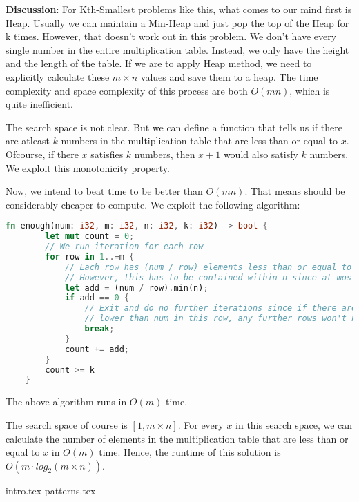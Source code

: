 \textbf{Discussion}: For Kth-Smallest problems like this, what comes to our mind first is Heap. Usually we can maintain a Min-Heap and just pop the top of the Heap for k times. However, that doesn't work out in this problem. We don't have every single number in the entire multiplication table. Instead, we only have the height and the length of the table. If we are to apply Heap method, we need to explicitly calculate these $m \times n$ values and save them to a heap. The time complexity and space complexity of this process are both $O(mn)$, which is quite inefficient.

The search space is not clear. But we can define a function  that tells us if there are atleast $k$ numbers in the multiplication table that are less than or equal to $x$. Ofcourse, if there $x$ satisfies $k$ numbers, then $x+1$ would also satisfy $k$ numbers. We exploit this monotonicity property.

Now, we intend to beat time to be better than $O(mn)$. That means  should be considerably cheaper to compute. We exploit the following algorithm:

\begin{lstlisting}[language=Rust, caption=Rust implementation of enough function]
    fn enough(num: i32, m: i32, n: i32, k: i32) -> bool {
        let mut count = 0;
        // We run iteration for each row
        for row in 1..=m {
            // Each row has (num / row) elements less than or equal to num. 
            // However, this has to be contained within n since at most there are n columns.
            let add = (num / row).min(n);
            if add == 0 {
                // Exit and do no further iterations since if there are no numbers 
                // lower than num in this row, any further rows won't have any as well.
                break;
            }
            count += add;
        }
        count >= k
    }
\end{lstlisting}

The above algorithm runs in $O(m)$ time.

The search space of course is $[1, m \times n]$. For every $x$ in this search space, we can calculate the number of elements in the multiplication table that are less than or equal to $x$ in $O(m)$ time. Hence, the runtime of this solution is $O(m \cdot log_2(m \times n))$.


{intro.tex}
{patterns.tex}